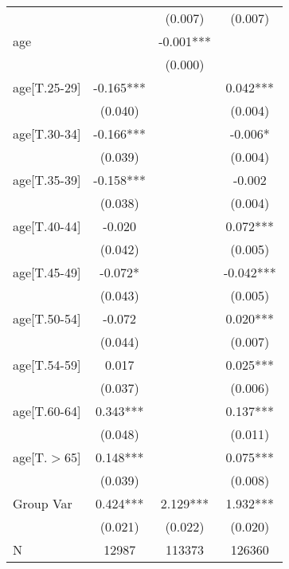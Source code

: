 \begin{table}
\begin{center}
\begin{tabular}{lccc}
                                  &            & (0.007)     & (0.007)      \\
age                               &            &\cellcolor{red!25} -0.001***   &              \\
                                  &            & (0.000)     &              \\
age[T.25-29]                      &\cellcolor{red!25} -0.165***  &             &\cellcolor{green!25} 0.042***     \\
                                  & (0.040)    &             & (0.004)      \\
age[T.30-34]                      &\cellcolor{red!25} -0.166***  &             &\cellcolor{red!25} -0.006*      \\
                                  & (0.039)    &             & (0.004)      \\
age[T.35-39]                      &\cellcolor{red!25} -0.158***  &             & -0.002       \\
                                  & (0.038)    &             & (0.004)      \\
age[T.40-44]                      & -0.020     &             &\cellcolor{green!25} 0.072***     \\
                                  & (0.042)    &             & (0.005)      \\
age[T.45-49]                      &\cellcolor{red!25} -0.072*    &             &\cellcolor{red!25} -0.042***    \\
                                  & (0.043)    &             & (0.005)      \\
age[T.50-54]                      & -0.072     &             &\cellcolor{green!25} 0.020***     \\
                                  & (0.044)    &             & (0.007)      \\
age[T.54-59]                      & 0.017      &             &\cellcolor{green!25} 0.025***     \\
                                  & (0.037)    &             & (0.006)      \\
age[T.60-64]                      &\cellcolor{green!25} 0.343***   &             &\cellcolor{green!25} 0.137***     \\
                                  & (0.048)    &             & (0.011)      \\
age[T.$>$65]                      &\cellcolor{green!25} 0.148***   &             &\cellcolor{green!25} 0.075***     \\
                                  & (0.039)    &             & (0.008)      \\
Group Var                         & 0.424***   & 2.129***    & 1.932***     \\
                                  & (0.021)    & (0.022)     & (0.020)      \\
N                                 & 12987 & 113373 & 126360  \\
\hline


\end{tabular}
\end{center}
\end{table}
